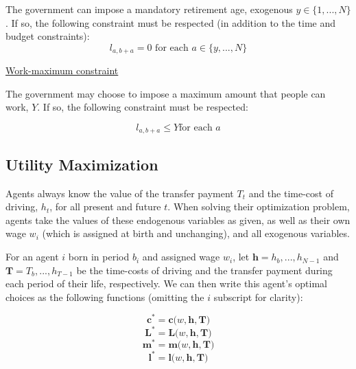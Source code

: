 \documentclass[letter, 12pt, epsf,leqno]{article}
\begin{document}
The government can impose a mandatory retirement age, exogenous $y \in \{1,...,N\}$.  If so, the following constraint must be respected (in addition to the time and budget constraints):
\begin{equation} l_{a, b+a} = 0 \text{ for each } a \in \{y,...,N\}\end{equation}

\vspace{5mm}
\underline{Work-maximum constraint}

The government may choose to impose a maximum amount that people can work, $Y$.  If so, the following constraint must be respected:

\begin{equation} l_{a, b+a} \le Y \text{for each } a\end{equation}






\subsection{Utility Maximization}

Agents always know the value of the transfer payment $T_t$ and the time-cost of driving, $h_t$, for all present and future $t$.  When solving their optimization problem, agents take the values of these endogenous variables as given, as well as their own wage $w_i$ (which is assigned at birth and unchanging), and all exogenous variables. 

For an agent $i$ born in period $b_i$ and assigned wage $w_i$, let $\boldsymbol{h}=h_b,...,h_{N-1}$ and  $\boldsymbol{T}=T_b,...,h_{T-1}$ be the time-costs of driving and the transfer payment during each period of their life, respectively.  We can then write this agent's optimal choices as the following functions (omitting the $i$ subscript for clarity):

\begin{equation}\boldsymbol{c}^* = \boldsymbol{c(}w, \boldsymbol{h}, \boldsymbol{T}\boldsymbol{)}\end{equation}
\begin{equation}\boldsymbol{L}^* = \boldsymbol{L(}w, \boldsymbol{h}, \boldsymbol{T}\boldsymbol{)}\end{equation}
\begin{equation}\boldsymbol{m}^* = \boldsymbol{m(}w, \boldsymbol{h}, \boldsymbol{T}\boldsymbol{)}\end{equation}
\begin{equation}\boldsymbol{l}^* = \boldsymbol{l(}w, \boldsymbol{h}, \boldsymbol{T}\boldsymbol{)}\end{equation}
\end{document}
